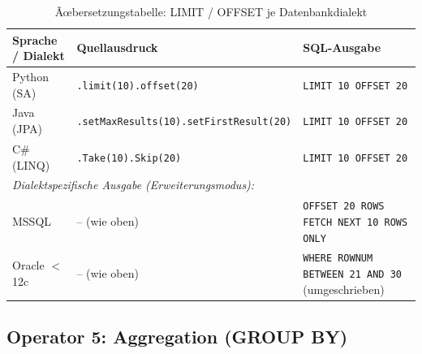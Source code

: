 \begin{table}
\centering
\caption{Ãœbersetzungstabelle: LIMIT / OFFSET je Datenbankdialekt}
\label{tab:limit_ops}
\renewcommand{\arraystretch}{1.4}
\begin{tabularx}{\textwidth}{lXX}
\toprule
\textbf{Sprache / Dialekt} & \textbf{Quellausdruck} & \textbf{SQL-Ausgabe} \\
\midrule
Python (SA)
  & \texttt{.limit(10).offset(20)}
  & \texttt{LIMIT 10 OFFSET 20} \\
Java (JPA)
  & \texttt{.setMaxResults(10).setFirstResult(20)}
  & \texttt{LIMIT 10 OFFSET 20} \\
C\# (LINQ)
  & \texttt{.Take(10).Skip(20)}
  & \texttt{LIMIT 10 OFFSET 20} \\
\midrule
\multicolumn{3}{l}{\textit{Dialektspezifische Ausgabe (Erweiterungsmodus):}} \\
MSSQL
  & -- (wie oben)
  & \texttt{OFFSET 20 ROWS FETCH NEXT 10 ROWS ONLY} \\
Oracle $<$12c
  & -- (wie oben)
  & \texttt{WHERE ROWNUM BETWEEN 21 AND 30} (umgeschrieben) \\
\bottomrule
\end{tabularx}
\end{table}

\subsection{Operator 5: Aggregation (GROUP BY)}
\label{subsec:op_agg}

